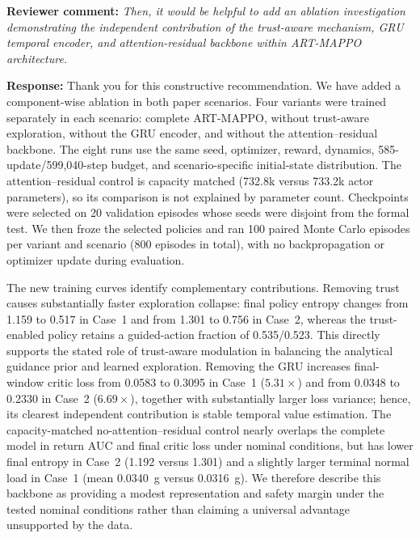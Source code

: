 \noindent\textbf{Reviewer comment:} \emph{Then, it would be helpful to add an ablation investigation demonstrating the independent contribution of the trust-aware mechanism, GRU temporal encoder, and attention-residual backbone within ART-MAPPO architecture.}

\medskip
\noindent\textbf{Response:} Thank you for this constructive recommendation. We have added a component-wise ablation in both paper scenarios. Four variants were trained separately in each scenario: complete ART-MAPPO, without trust-aware exploration, without the GRU encoder, and without the attention--residual backbone. The eight runs use the same seed, optimizer, reward, dynamics, 585-update/599,040-step budget, and scenario-specific initial-state distribution. The attention--residual control is capacity matched (732.8k versus 733.2k actor parameters), so its comparison is not explained by parameter count. Checkpoints were selected on 20 validation episodes whose seeds were disjoint from the formal test. We then froze the selected policies and ran 100 paired Monte Carlo episodes per variant and scenario (800 episodes in total), with no backpropagation or optimizer update during evaluation.

The new training curves identify complementary contributions. Removing trust causes substantially faster exploration collapse: final policy entropy changes from 1.159 to 0.517 in Case~1 and from 1.301 to 0.756 in Case~2, whereas the trust-enabled policy retains a guided-action fraction of 0.535/0.523. This directly supports the stated role of trust-aware modulation in balancing the analytical guidance prior and learned exploration. Removing the GRU increases final-window critic loss from 0.0583 to 0.3095 in Case~1 ($5.31\times$) and from 0.0348 to 0.2330 in Case~2 ($6.69\times$), together with substantially larger loss variance; hence, its clearest independent contribution is stable temporal value estimation. The capacity-matched no-attention--residual control nearly overlaps the complete model in return AUC and final critic loss under nominal conditions, but has lower final entropy in Case~2 (1.192 versus 1.301) and a slightly larger terminal normal load in Case~1 (mean 0.0340~g versus 0.0316~g). We therefore describe this backbone as providing a modest representation and safety margin under the tested nominal conditions rather than claiming a universal advantage unsupported by the data.

